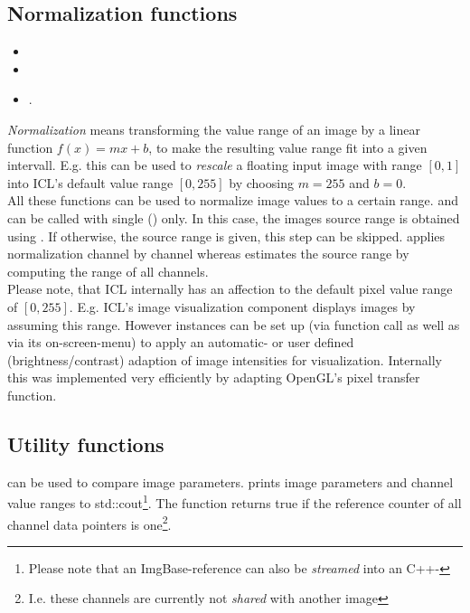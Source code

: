 \subsection{Normalization functions}
\begin{itemize}
\item {}
\item {}
\item {}.
\end{itemize} 
\emph{Normalization} means transforming the value range of an image by a linear function $f(x)=mx+b$, to make the resulting value range fit into a given intervall. E.g. this can be used to \emph{rescale} a floating input image with range $[0,1]$ into ICL's default value range $[0,255]$ by choosing $m=255$ and $b=0$. \\
All these functions can be used to normalize image values to a certain range.  and  can be called with single  () only. In this case, the images source range is obtained using . If otherwise, the source range is given, this step can be skipped.  applies normalization channel by channel whereas  estimates the source range by computing the range of all channels.\\
Please note, that ICL internally has an affection to the default pixel value range of $[0,255]$. E.g. ICL's image visualization component 
displays images by assuming this range. However  instances can be set up (via function call as well as via its on-screen-menu) to apply an
automatic- or user defined (brightness/contrast) adaption of image intensities for visualization. Internally this was implemented very efficiently by adapting OpenGL's pixel transfer function.

\subsection{Utility functions}
 can be used to compare image parameters.  prints image parameters and channel value ranges to std::cout\footnote{Please note that an ImgBase-reference can also be \emph{streamed} into an C++-}. The  function returns true if the reference counter of all channel data pointers is one\footnote{I.e. these channels are currently not \emph{shared} with another image}.
